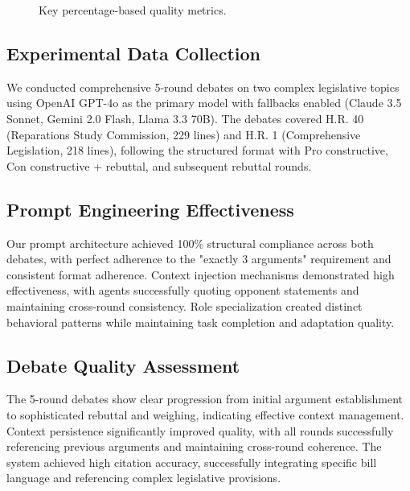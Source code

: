 \documentclass{article}
\begin{document}
\begin{figure}[t]
\centering
{}
\caption{Key percentage-based quality metrics.}
\label{fig:percentages}
\end{figure}

\subsection{Experimental Data Collection}

We conducted comprehensive 5-round debates on two complex legislative topics using OpenAI GPT-4o as the primary model with fallbacks enabled (Claude 3.5 Sonnet, Gemini 2.0 Flash, Llama 3.3 70B). The debates covered H.R. 40 (Reparations Study Commission, 229 lines) and H.R. 1 (Comprehensive Legislation, 218 lines), following the structured format with Pro constructive, Con constructive + rebuttal, and subsequent rebuttal rounds.

\subsection{Prompt Engineering Effectiveness}

Our prompt architecture achieved 100\% structural compliance across both debates, with perfect adherence to the "exactly 3 arguments" requirement and consistent format adherence. Context injection mechanisms demonstrated high effectiveness, with agents successfully quoting opponent statements and maintaining cross-round consistency. Role specialization created distinct behavioral patterns while maintaining task completion and adaptation quality.

\subsection{Debate Quality Assessment}

The 5-round debates show clear progression from initial argument establishment to sophisticated rebuttal and weighing, indicating effective context management. Context persistence significantly improved quality, with all rounds successfully referencing previous arguments and maintaining cross-round coherence. The system achieved high citation accuracy, successfully integrating specific bill language and referencing complex legislative provisions.
\end{document}
